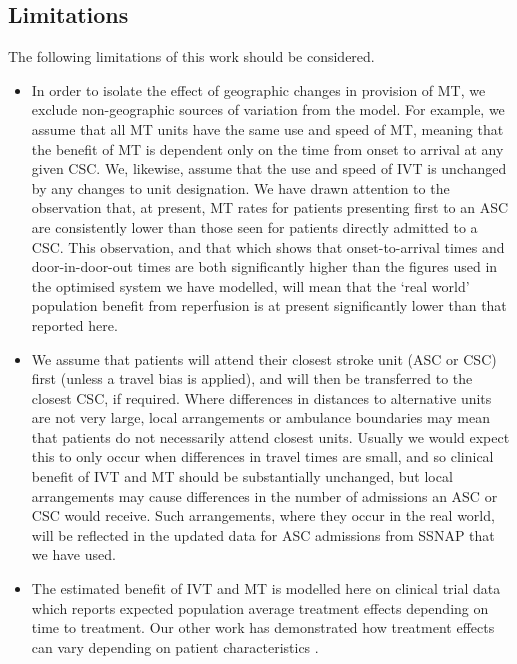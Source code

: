 \subsection{Limitations}

The following limitations of this work should be considered.

\begin{itemize}

    \item In order to isolate the effect of geographic changes in provision of MT, we exclude non-geographic sources of variation from the model. For example, we assume that all MT units have the same use and speed of MT, meaning that the benefit of MT is dependent only on the time from onset to arrival at any given CSC. We, likewise, assume that the use and speed of IVT is unchanged by any changes to unit designation. We have drawn attention to the observation that, at present, MT rates for patients presenting first to an ASC are consistently lower than those seen for patients directly admitted to a CSC. This observation, and that which shows that onset-to-arrival times and door-in-door-out times are both significantly higher than the figures used in the optimised system we have modelled, will mean that the `real world' population benefit from reperfusion is at present significantly lower than that reported here.

    \item We assume that patients will attend their closest stroke unit (ASC or CSC) first (unless a travel bias is applied), and will then be transferred to the closest CSC, if required. Where differences in distances to alternative units are not very large, local arrangements or ambulance boundaries may mean that patients do not necessarily attend closest units. Usually we would expect this to only occur when differences in travel times are small, and so clinical benefit of IVT and MT should be substantially unchanged, but local arrangements may cause differences in the number of admissions an ASC or CSC would receive. Such arrangements, where they occur in the real world, will be reflected in the updated data for ASC admissions from SSNAP that we have used.

    \item The estimated benefit of IVT and MT is modelled here on clinical trial data which reports expected population average treatment effects depending on time to treatment. Our other work has demonstrated how treatment effects can vary depending on patient characteristics \cite{pearn2026machine}.
\end{itemize}

